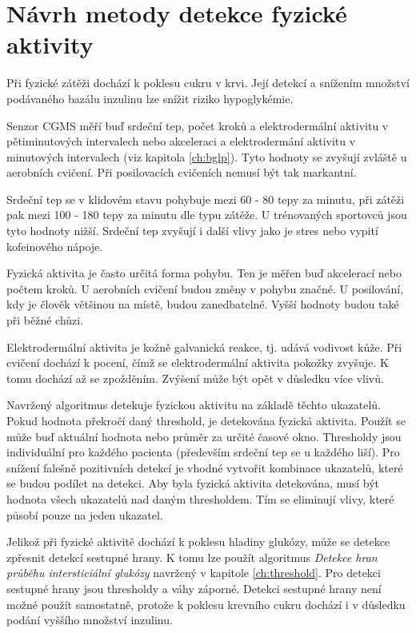 \chapter{Návrh metody detekce fyzické aktivity}

Při fyzické zátěži dochází k poklesu cukru v krvi. Její detekcí a snížením množství podávaného bazálu inzulinu lze snížit riziko hypoglykémie.

Senzor CGMS měří buď srdeční tep, počet kroků a elektrodermální aktivitu v pětiminutových intervalech nebo akceleraci a elektrodermání aktivitu v minutových intervalech (viz kapitola \ref{ch:bglp}). Tyto hodnoty se zvyšují zvláště u aerobních cvičení. Při posilovacích cvičeních nemusí být tak markantní.

Srdeční tep se v klidovém stavu pohybuje mezi 60 - 80 tepy za minutu, při zátěži pak mezi 100 - 180 tepy za minutu dle typu zátěže. U trénovaných sportovců jsou tyto hodnoty nižší. Srdeční tep zvyšují i další vlivy jako je stres nebo vypití kofeinového nápoje.

Fyzická aktivita je často určitá forma pohybu. Ten je měřen buď akcelerací nebo počtem kroků. U aerobních cvičení budou změny v pohybu značné. U posilování, kdy je člověk většinou na místě, budou zanedbatelné. Vyšší hodnoty budou také při běžné chůzi.

Elektrodermální aktivita je kožně galvanická reakce, tj. udává vodivost kůže. Při cvičení dochází k pocení, čímž se elektrodermální aktivita pokožky zvyšuje. K tomu dochází až se zpožděním. Zvýšení může být opět v důsledku více vlivů.

Navržený algoritmus detekuje fyzickou aktivitu na základě těchto ukazatelů. Pokud hodnota překročí daný threshold, je detekována fyzická aktivita. Použít se může buď aktuální hodnota nebo průměr za určité časové okno. Thresholdy jsou individuální pro každého pacienta (především srdeční tep se u každého liší).  Pro snížení falešně pozitivních detekcí je vhodné vytvořit kombinace ukazatelů, které se budou podílet na detekci. Aby byla fyzická aktivita detekována, musí být hodnota všech ukazatelů nad daným thresholdem. Tím se eliminují vlivy, které působí pouze na jeden ukazatel.

Jelikož při fyzické aktivitě dochází k poklesu hladiny glukózy, může se detekce zpřesnit detekcí sestupné hrany. K tomu lze použít algoritmus \textit{Detekce hran průběhu intersticiální glukózy} navržený v kapitole \ref{ch:threshold}. Pro detekci sestupné hrany jsou thresholdy a váhy záporné. Detekci sestupné hrany není možné použít samostatně, protože k poklesu krevního cukru dochází i v důsledku podání vyššího množství inzulinu.\enlargethispage{\baselineskip} %
